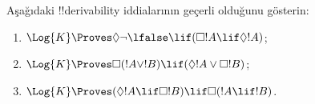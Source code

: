 \begin{prob}
  Aşağıdaki !!{derivability} iddialarının geçerli olduğunu gösterin:
  \begin{enumerate}
  \item $\Log{K} \Proves \Diamond \lnot \lfalse \lif (\Box !A \lif
    \Diamond !A)$;
  \item $\Log{K} \Proves \Box(!A \lor !B) \lif (\Diamond !A \lor \Box
    !B)$;
  \item $\Log{K} \Proves (\Diamond !A \lif \Box !B) \lif \Box(!A \lif
    !B)$.
  \end{enumerate}
\end{prob}

